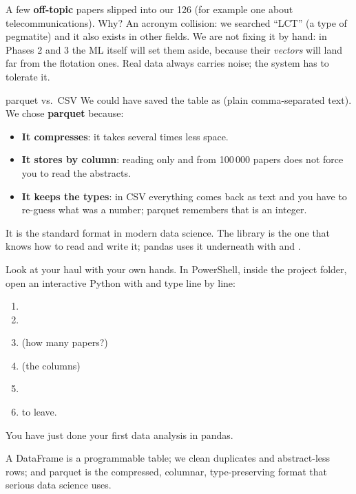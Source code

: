 \documentclass[11pt,a4paper]{article}
\begin{document}
\begin{ojo}
A few \textbf{off-topic} papers slipped into our 126 (for example one about
telecommunications). Why? An acronym collision: we searched ``LCT'' (a type of pegmatite) and
it also exists in other fields. We are not fixing it by hand: in Phases 2 and 3 the ML itself
will set them aside, because their \emph{vectors} will land far from the flotation ones. Real
data always carries noise; the system has to tolerate it.
\end{ojo}

\begin{concepto}{parquet vs.\ CSV}
We could have saved the table as  (plain comma-separated text). We chose
\textbf{parquet} because:
\begin{itemize}
  \item \textbf{It compresses}: it takes several times less space.
  \item \textbf{It stores by column}: reading only  and  from
        100\,000 papers does not force you to read the abstracts.
  \item \textbf{It keeps the types}: in CSV everything comes back as text and you have to
        re-guess what was a number; parquet remembers that  is an integer.
\end{itemize}
It is the standard format in modern data science. The  library is the one
that knows how to read and write it; pandas uses it underneath with
 and .
\end{concepto}

\begin{practica}
Look at your haul with your own hands. In PowerShell, inside the project folder, open an
interactive Python with  and
type line by line:
\begin{enumerate}
  \item {}
  \item {}
  \item {} \quad (how many papers?)
  \item {} \quad (the columns)
  \item {}
  \item {} to leave.
\end{enumerate}
You have just done your first data analysis in pandas.
\end{practica}

\begin{resumen}
A DataFrame is a programmable table; we clean duplicates and abstract-less rows; and parquet
is the compressed, columnar, type-preserving format that serious data science uses.
\end{resumen}
\end{document}
